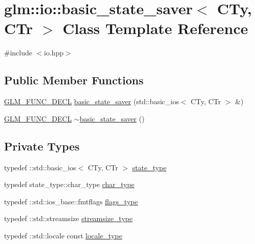 \hypertarget{classglm_1_1io_1_1basic__state__saver}{}\section{glm\+:\+:io\+:\+:basic\+\_\+state\+\_\+saver$<$ C\+Ty, C\+Tr $>$ Class Template Reference}
\label{classglm_1_1io_1_1basic__state__saver}


{\ttfamily \#include $<$io.\+hpp$>$}

\subsection*{Public Member Functions}
\begin{DoxyCompactItemize}
\item 
\hyperlink{setup_8hpp_ab2d052de21a70539923e9bcbf6e83a51}{G\+L\+M\+\_\+\+F\+U\+N\+C\+\_\+\+D\+E\+CL} \hyperlink{classglm_1_1io_1_1basic__state__saver_ab31652b0b7f2a24fa8f9fda2505de356}{basic\+\_\+state\+\_\+saver} (std\+::basic\+\_\+ios$<$ C\+Ty, C\+Tr $>$ \&)
\item 
\hyperlink{setup_8hpp_ab2d052de21a70539923e9bcbf6e83a51}{G\+L\+M\+\_\+\+F\+U\+N\+C\+\_\+\+D\+E\+CL} \hyperlink{classglm_1_1io_1_1basic__state__saver_ad89569bbaec5d7fe08d40dbac5abbb53}{$\sim$basic\+\_\+state\+\_\+saver} ()
\end{DoxyCompactItemize}
\subsection*{Private Types}
\begin{DoxyCompactItemize}
\item 
typedef \+::std\+::basic\+\_\+ios$<$ C\+Ty, C\+Tr $>$ \hyperlink{classglm_1_1io_1_1basic__state__saver_a84787cc03192543bfe67ef25e7f20aa6}{state\+\_\+type}
\item 
typedef state\+\_\+type\+::char\+\_\+type \hyperlink{classglm_1_1io_1_1basic__state__saver_ae6abb8e2e6bd4a044e953746691ffe8e}{char\+\_\+type}
\item 
typedef \+::std\+::ios\+\_\+base\+::fmtflags \hyperlink{classglm_1_1io_1_1basic__state__saver_a73ca8320543524c7ab7f1ce97d30aff6}{flags\+\_\+type}
\item 
typedef \+::std\+::streamsize \hyperlink{classglm_1_1io_1_1basic__state__saver_a0a4c44df9a4fcf7531af6da7698e0931}{streamsize\+\_\+type}
\item 
typedef \+::std\+::locale const \hyperlink{classglm_1_1io_1_1basic__state__saver_acc657f13df9c1fd68e1014b96ff615cb}{locale\+\_\+type}
\end{DoxyCompactItemize}
